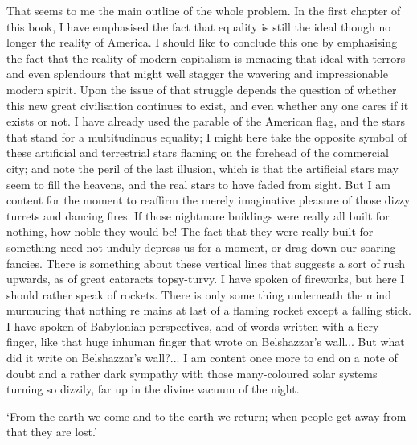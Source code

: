 \documentclass{book}
\begin{document}
That seems to me the main outline of the whole problem. In the first chapter of this book, I have emphasised the fact that equality is still the ideal though no longer the reality of America. I should like to conclude this one by emphasising the fact that the reality of modern capitalism is menacing that ideal with terrors and even splendours that might well stagger the wavering and impressionable modern spirit. Upon the issue of that struggle depends the question of whether this new great civilisation continues to exist, and even whether any one cares if it exists or not. I have already used the parable of the American flag, and the stars that stand for a multitudinous equality; I might here take the opposite symbol of these artificial and terrestrial stars flaming on the forehead of the commercial city; and note the peril of the last illusion, which is that the artificial stars may seem to fill the heavens, and the real stars to have faded from sight. But I am content for the moment to reaffirm the merely imaginative pleasure of those dizzy turrets and dancing fires. If those nightmare buildings were really all built for nothing, how noble they would be! The fact that they were really built for something need not unduly depress us for a moment, or drag down our soaring fancies. There is something about these vertical lines that suggests a sort of rush upwards, as of great cataracts topsy-turvy. I have spoken of fireworks, but here I should rather speak of rockets. There is only some thing underneath the mind murmuring that nothing re mains at last of a flaming rocket except a falling stick. I have spoken of Babylonian perspectives, and of words written with a fiery finger, like that huge inhuman finger that wrote on Belshazzar’s wall... But what did it write on Belshazzar’s wall?... I am content once more to end on a note of doubt and a rather dark sympathy with those many-coloured solar systems turning so dizzily, far up in the divine vacuum of the night.

‘From the earth we come and to the earth we return; when people get away from that they are lost.’
\end{document}
